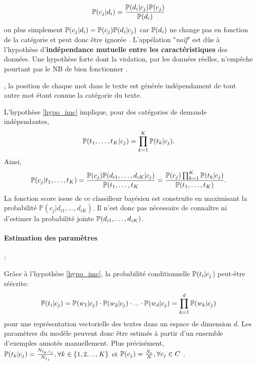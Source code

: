 \[\mathbb{P}(c_j \vert d_i) = \frac{\mathbb{P}(d_i \vert c_j)\mathbb{P}(c_j)}{\mathbb{P}(d_i)}\]
ou plus simplement  $\mathbb{P}(c_j \vert d_i) = \mathbb{P}(c_j)\mathbb{P}(d_i \vert c_j)$ car $\mathbb{P}(d_i)$ ne change pas en fonction de la catégorie et peut donc être ignorée \citep{rish2001nb_study}.
L'appélation "\textit{naïf}" est dûe à l'hypothèse d'\textbf{indépendance mutuelle entre les caractéristiques} des données. Une hypothèse %
forte dont la violation, par les données réelles, n'empêche pourtant pas le NB de bien fonctionner \citep{rish2001nb_study}. 

\begin{hypothese}, la position de chaque mot dans le texte est générée indépendament de tout autre mot étant connue la catégorie du texte. \label{hypo_imc}
\end{hypothese}

\noindent L'hypothèse \ref{hypo_imc} implique, pour des catégories de demande indépendantes,
\[
\mathbb{P}(t_{1}, \dots, t_{K}\vert c_j) = \prod_{k=1}^K \mathbb{P}(t_{k} \vert c_j).
\]
Ainsi,
\begin{equation}\notag
\mathbb{P}(c_j\vert t_{1}, \dots, t_{K}) = \frac{\mathbb{P}(c_j)\mathbb{P}(d_{i1}, \dots, d_{iK} \vert c_j)}{\mathbb{P}(t_{1}, \dots, t_{K}} = \frac{\mathbb{P}(c_j)\prod_{k=1}^K \mathbb{P}(t_{k} \vert c_j)}{\mathbb{P}(t_{1}, \dots, t_{K})}.
\end{equation}
La fonction score issue de ce classifieur bayésien est construite en maximisant la probabilité $\mathbb{P}(c_j\vert d_{i1}, \dots, d_{iK})$. Il n'est donc pas nécessaire de connaître ni d'estimer la probabilité jointe $\mathbb{P}(d_{i1}, \dots, d_{iK})$.

\paragraph{Estimation des paramètres}: 


Grâce à l'hypothèse \ref{hypo_imc}, la probabilité conditionnelle $\mathbb{P}(t_i \vert c_j$) peut-être réécrite:
\[\mathbb{P}(t_i \vert c_j) = \mathbb{P}(w_1 \vert c_j)\cdot \mathbb{P}(w_2 \vert c_j) \cdot ... \cdot \mathbb{P}(w_d \vert c_j) = \prod\limits_{k = 1}^d \mathbb{P}(w_k \vert c_j)\]
pour une représentation vectorielle des textes dans un espace de dimension $d$.
Les paramètres du modèle peuvent donc être estimés à partir d'un ensemble d'exemples annotés manuellement. Plus précisément, $\mathbb{P}(t_k \vert c_j) = \frac{N_{t_k,c_j}}{N_{c_j}}, \forall k \in \lbrace 1, 2, ..., K \rbrace$ et $\mathbb{P}(c_j) = \frac{N_c}{N}, \forall c_j \in C$ .

